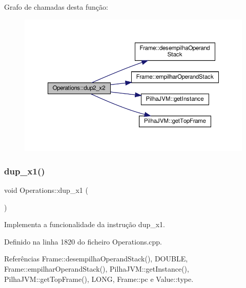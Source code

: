 Grafo de chamadas desta função\+:
\nopagebreak
\begin{figure}[H]
\begin{center}
\leavevmode
\includegraphics[width=350pt]{classOperations_ab49247b3958376b27e8347e053dfe7de_cgraph}
\end{center}
\end{figure}
\mbox{\label{classOperations_a46bab81a4a4bd1eda1c89b0b74f9e014}} 
\subsubsection{\texorpdfstring{dup\+\_\+x1()}{dup\_x1()}}
{\footnotesize\ttfamily void Operations\+::dup\+\_\+x1 (\begin{DoxyParamCaption}{ }\end{DoxyParamCaption})\hspace{0.3cm}{\ttfamily [private]}}



Implementa a funcionalidade da instrução dup\+\_\+x1. 



Definido na linha 1820 do ficheiro Operations.\+cpp.



Referências Frame\+::desempilha\+Operand\+Stack(), D\+O\+U\+B\+LE, Frame\+::empilhar\+Operand\+Stack(), Pilha\+J\+V\+M\+::get\+Instance(), Pilha\+J\+V\+M\+::get\+Top\+Frame(), L\+O\+NG, Frame\+::pc e Value\+::type.

